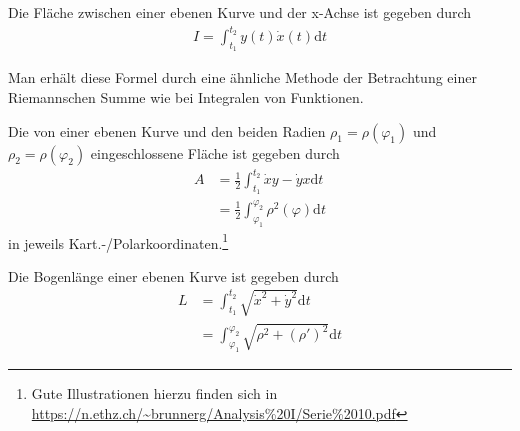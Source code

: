\documentclass[12pt]{article}
\newcommand{\dt}{\mathrm{d}t}
\newenvironment{definition}[2][Definition]{\begin{trivlist}
        \item[\hskip \labelsep {\bfseries #1}\hskip \labelsep {\bfseries #2.}]}{\flushright{$\square$}\end{trivlist}}
\begin{document}
\begin{definition}{[Integrale ebener Kurven]}
    Die Fläche zwischen einer ebenen Kurve und der x-Achse ist gegeben durch
    \begin{align}
        I=\int_{t_1}^{t_2}y(t)\dot{x}(t)\dt
    \end{align}

    Man erhält diese Formel durch eine ähnliche Methode der Betrachtung einer
    Riemannschen Summe wie bei Integralen von Funktionen.
\end{definition}

\begin{definition}{[Sektorfläche (pos.~falls links)]}
    Die von einer ebenen Kurve und den beiden Radien $\rho_1=\rho(\varphi_1)$ und $\rho_2=\rho(\varphi_2)$ eingeschlossene Fläche ist gegeben durch
    \begin{align}
        A & =\frac{1}{2}\int_{t_1}^{t_2}\dot{x}y-\dot{y}x\dt            \\
          & = \frac{1}{2}\int_{\varphi_1}^{\varphi_2}\rho^2(\varphi)\dt
    \end{align}
    in jeweils Kart.-/Polarkoordinaten.\footnote{Gute Illustrationen hierzu finden sich in  \url{https://n.ethz.ch/\~brunnerg/Analysis\%20I/Serie\%2010.pdf}}
\end{definition}

\begin{definition}{[Bogenlänge]}
    Die Bogenlänge einer ebenen Kurve ist gegeben durch
    \begin{align}
        L & =\int_{t_1}^{t_2}\sqrt{\dot{x}^2+\dot{y}^2}\dt        \\
          & =\int_{\varphi_1}^{\varphi_2}\sqrt{\rho^2+(\rho')^2}\dt
    \end{align}
\end{definition}
\end{document}

